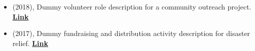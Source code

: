\begin{itemize}[itemsep=-3pt, left=0pt]
    
    \item (2018), Dummy volunteer role description for a community outreach project. \textbf{{\href{https://www.example.com/volunteer}{Link}}}
    \item (2017), Dummy fundraising and distribution activity description for disaster relief. \textbf{{\href{https://www.example.com/volunteer}{Link}}}
    
\end{itemize}
\vspace{-12pt}

